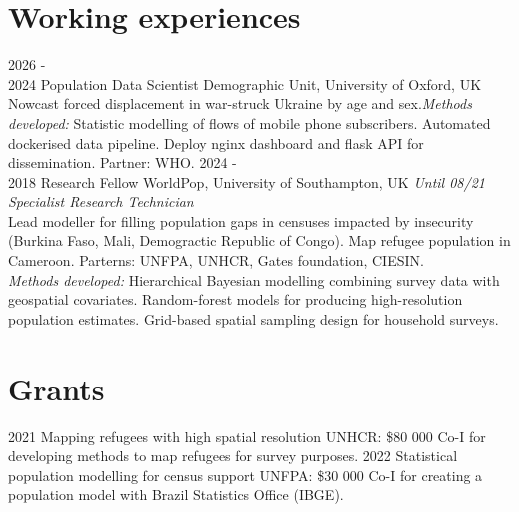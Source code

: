 \documentclass[
]{friggeri-cv}
\begin{document}
\section{Working experiences}
\begin{entrylist}
\entry
{2026 - \\ 2024}
{Population Data Scientist}
{Demographic Unit, University of Oxford, UK}
{Nowcast forced displacement in war-struck Ukraine by age and sex.\textit{Methods developed:} Statistic modelling of flows of mobile phone subscribers. Automated dockerised data pipeline. Deploy nginx dashboard and flask API for dissemination. Partner: WHO.}
\entry
{2024 - \\ 2018}
{Research Fellow}
{WorldPop, University of Southampton, UK}
{\textit{Until 08/21 Specialist Research Technician}\\
Lead modeller for filling population gaps in censuses impacted by insecurity (Burkina Faso, Mali, Demogractic Republic of Congo). Map  refugee population in Cameroon. Parterns: UNFPA, UNHCR, Gates foundation, CIESIN. \\
\textit{Methods developed:} Hierarchical Bayesian modelling combining survey data with geospatial covariates. Random-forest models for producing high-resolution population estimates. Grid-based spatial sampling design for household surveys.}
\end{entrylist}

\section{Grants}
\begin{entrylist}
\entry
{2021}
{Mapping refugees with high spatial resolution}
{UNHCR: \$80 000}
{Co-I for developing methods to map refugees for survey purposes.}
\entry
{2022}
{Statistical population modelling for census support}
{UNFPA: \$30 000}
{Co-I for creating a population model with Brazil Statistics Office (IBGE).}
\end{entrylist}
\end{document}
